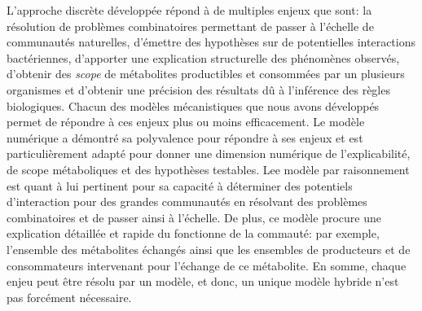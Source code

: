 \documentclass[../main.tex]{subfiles}
\begin{document}
L'approche discrète développée répond à de multiples enjeux que sont: la résolution de problèmes combinatoires permettant de passer à l'échelle de communautés naturelles, d'émettre des hypothèses sur de potentielles interactions bactériennes, d'apporter une explication structurelle des phénomènes observés, d'obtenir des \textit{scope} de métabolites productibles et consommées par un plusieurs organismes et d'obtenir une précision des résultats dû à l'inférence des règles biologiques. Chacun des modèles mécanistiques que nous avons développés permet de répondre à ces enjeux plus ou moins efficacement. Le modèle numérique a démontré sa polyvalence pour répondre à ses enjeux et est particulièrement adapté pour donner une dimension numérique de l'explicabilité, de scope métaboliques et des hypothèses testables. Lee modèle par raisonnement est quant à lui pertinent pour sa capacité à déterminer des potentiels d'interaction pour des grandes communautés en résolvant des problèmes combinatoires et de passer ainsi à l'échelle. De plus, ce modèle procure une explication détaillée et rapide du fonctionne de la commauté: par exemple, l'ensemble des métabolites échangés ainsi que les ensembles de producteurs et de consommateurs intervenant pour l'échange de ce métabolite. En somme, chaque enjeu peut être résolu par un modèle, et donc, un unique modèle hybride n'est pas forcément nécessaire.
\end{document}
